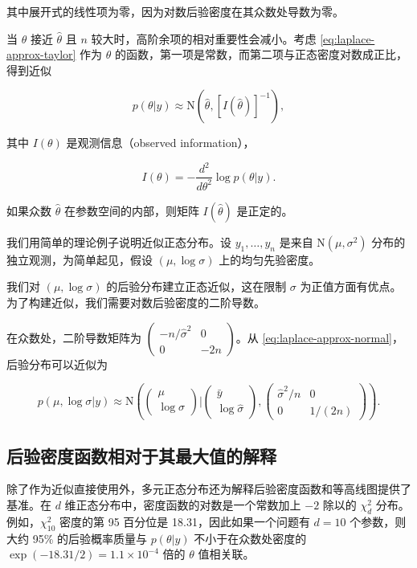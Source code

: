 其中展开式的线性项为零，因为对数后验密度在其众数处导数为零。

当 $\theta$ 接近 $\hat{\theta}$ 且 $n$ 较大时，高阶余项的相对重要性会减小。考虑 \cref{eq:laplace-approx-taylor} 作为 $\theta$ 的函数，第一项是常数，而第二项与正态密度对数成正比，得到近似

\[
p(\theta | y) \approx \mathrm{N}(\hat{\theta}, [I(\hat{\theta})]^{-1}), \label{eq:laplace-approx-normal}
\]

其中 $I(\theta)$ 是观测信息（observed information），

\[
I(\theta) = -\frac{d^2}{d\theta^2} \log p(\theta | y).
\]

如果众数 $\hat{\theta}$ 在参数空间的内部，则矩阵 $I(\hat{\theta})$ 是正定的。

\begin{Example}[均值和方差均未知的正态分布]
  我们用简单的理论例子说明近似正态分布。设 $y_1, \ldots, y_n$ 是来自 $\mathrm{N}(\mu, \sigma^2)$ 分布的独立观测，为简单起见，假设 $(\mu, \log \sigma)$ 上的均匀先验密度。

  我们对 $(\mu, \log \sigma)$ 的后验分布建立正态近似，这在限制 $\sigma$ 为正值方面有优点。为了构建近似，我们需要对数后验密度的二阶导数。

  在众数处，二阶导数矩阵为 $\begin{pmatrix} -n/\hat{\sigma}^2 & 0 \\ 0 & -2n \end{pmatrix}$。从 \cref{eq:laplace-approx-normal}，后验分布可以近似为

  \[
  p(\mu, \log \sigma | y) \approx \mathrm{N}\left(\left(\begin{array}{c} \mu \\ \log \sigma \end{array}\right) \Big| \left(\begin{array}{c} \bar{y} \\ \log \hat{\sigma} \end{array}\right), \left(\begin{array}{cc} \hat{\sigma}^2/n & 0 \\ 0 & 1/(2n) \end{array}\right)\right).
  \]
\end{Example}

\subsection{后验密度函数相对于其最大值的解释}

除了作为近似直接使用外，多元正态分布还为解释后验密度函数和等高线图提供了基准。在 $d$ 维正态分布中，密度函数的对数是一个常数加上 $-2$ 除以的 $\chi_d^2$ 分布。例如，$\chi_{10}^2$ 密度的第 95 百分位是 18.31，因此如果一个问题有 $d = 10$ 个参数，则大约 95\% 的后验概率质量与 $p(\theta | y)$ 不小于在众数处密度的 $\exp(-18.31/2) = 1.1 \times 10^{-4}$ 倍的 $\theta$ 值相关联。

